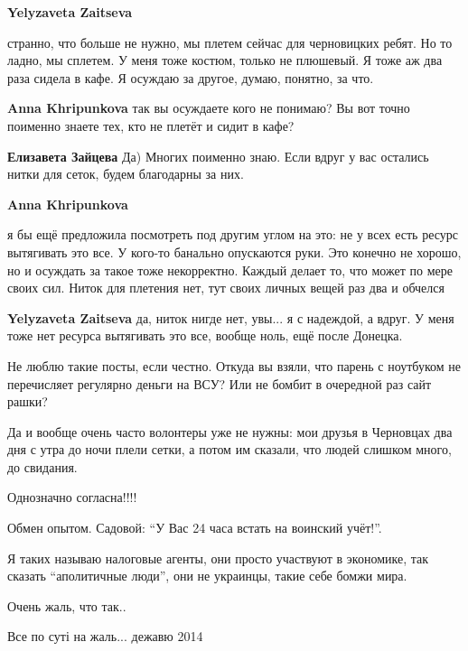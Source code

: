 \begin{itemize}
\begin{itemize}
\textbf{Yelyzaveta Zaitseva} 

странно, что больше не нужно, мы плетем сейчас для черновицких ребят. Но то
ладно, мы сплетем. У меня тоже костюм, только не плюшевый. Я тоже аж два раза
сидела в кафе. Я осуждаю за другое, думаю, понятно, за что.

\textbf{Anna Khripunkova} так вы осуждаете кого не понимаю? Вы вот точно поименно знаете тех, кто не плетёт и сидит в кафе?

\textbf{Елизавета Зайцева} Да) Многих поименно знаю. Если вдруг у вас остались нитки для сеток, будем благодарны за них.

\textbf{Anna Khripunkova} 

я бы ещё предложила посмотреть под другим углом на это: не у всех есть ресурс
вытягивать это все. У кого-то банально опускаются руки. Это конечно не хорошо,
но и осуждать за такое тоже некорректно. Каждый делает то, что может по мере
своих сил. Ниток для плетения нет, тут своих личных вещей раз два и обчелся

\textbf{Yelyzaveta Zaitseva} да, ниток нигде нет, увы... я с надеждой, а вдруг. У меня тоже нет ресурса вытягивать это все, вообще ноль, ещё после Донецка.
\end{itemize} %


Не люблю такие посты, если честно. Откуда вы взяли, что парень с ноутбуком не
перечисляет регулярно деньги на ВСУ? Или не бомбит в очередной раз сайт рашки?

Да и вообще очень часто волонтеры уже не нужны: мои друзья в Черновцах два дня
с утра до ночи плели сетки, а потом им сказали, что людей слишком много, до
свидания.

Однозначно согласна!!!!

Обмен опытом. Садовой: \enquote{У Вас 24 часа встать на воинский учёт!}.


Я таких называю налоговые агенты, они просто участвуют в экономике, так сказать
\enquote{аполитичные люди}, они не украинцы, такие себе бомжи мира.

Очень жаль, что так..

Все по суті на жаль... дежавю 2014



\end{itemize}
